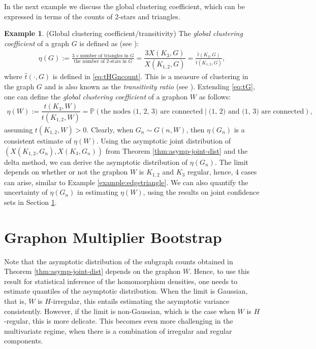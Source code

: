 \documentclass[11pt,reqno]{amsart}
\numberwithin{equation}{section}
\renewcommand{\P}{\mathbb{P}}
\theoremstyle{definition}
\newtheorem{example}{Example}[section]
\begin{document}
In the next example we discuss the global clustering coefficient, which can be expressed in terms of the counts of 2-stars and triangles. 


\begin{example}(Global clustering coefficient/transitivity) 
The {\it global clustering coefficient} of a graph $G$ is defined as (see \cite{luce1949method}): 
\begin{align}\label{eq:tG}
\eta(G) := \frac{3 \times \text{number of triangles in } G}{ \text{the number of 2-stars in } G } = \dfrac{3 X(K_{3}, G)}{X(K_{1, 2}, G)} = \frac{\hat{t}(K_{3}, G)}{\hat{t}(K_{1, 2},G)},
\end{align} 
where $\hat{t}(\cdot, G)$ is defined in \eqref{eq:tHGncount}.
    This is a measure of clustering in the graph $G$ and is also known as the {\it transitivity ratio} (see \cite[Page 243]{wasserman1994social}). Extending \eqref{eq:tG}, one can define the {\it global clustering coefficient} of a graphon $W$ as follows: 
\begin{align*}
    \eta(W) := \dfrac{t(K_{3},W)}{t(K_{1, 2},W)} = \P\left(\text{the nodes (1, 2, 3) are connected} \mid \text{(1, 2) and (1, 3) are connected} \right), 
    \end{align*}
    assuming $t(K_{1, 2},W) > 0$. Clearly, when $G_n \sim G(n, W)$, then $\eta(G_n)$ is a consistent estimate of $\eta(W)$. Using the asymptotic joint distribution of $(X(K_{1, 2}, G_n), X(K_3, G_n) ) $ from Theorem \ref{thm:asymp-joint-dist} and the delta method, we can derive the asymptotic distribution of $\eta(G_n)$. The limit depends on whether or not the graphon $W$ is $K_{1, 2}$ and $K_3$ regular, hence, 4 cases can arise, similar to Example \ref{example:edgetriangle}. We can also quantify the uncertainty of $\eta(G_n)$ in estimating $\eta(W)$, using the results on joint confidence sets in Section \ref{sec:estimatedistribution}.   
        \end{example} 



\section{Graphon Multiplier Bootstrap}
\label{sec:estimatedistribution}

Note that the asymptotic distribution of the subgraph counts obtained in Theorem \ref{thm:asymp-joint-dist} depends on the graphon $W$. Hence, to use this result for statistical inference of the homomorphism densities, one needs to estimate quantiles of the asymptotic distribution. When the limit is Gaussian, that is, $W$ is $H$-irregular, this entails estimating the asymptotic variance consistently. However, if the limit is non-Gaussian, which is the case when $W$ is $H$-regular,  this is more delicate. This becomes even more challenging in the multivariate regime, when there is a combination of irregular and regular components. 
\end{document}
